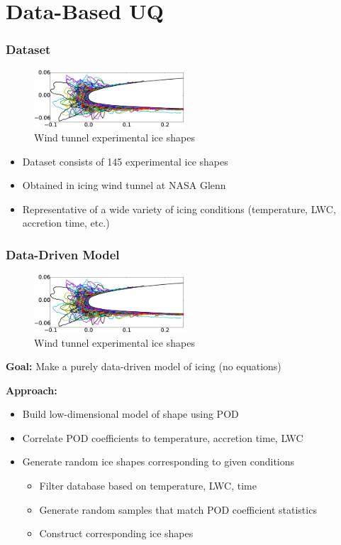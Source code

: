 \documentclass[9pt]{beamer}
\begin{document}
\section{Data-Based UQ}
\label{sec-2}
\begin{frame}
\frametitle{Dataset}
\label{sec-2-1}

\vspace*{-0.0cm}\begin{figure}
      \includegraphics[width=0.5\textwidth]{GlobalDataSet}
      \caption{Wind tunnel experimental ice shapes}
\end{figure}
\begin{itemize}
\item Dataset consists of 145 experimental ice shapes
\item Obtained in icing wind tunnel at NASA Glenn\footnotemark[1]
\item Representative of a wide variety of icing conditions (temperature,
  LWC, accretion time, etc.)
\end{itemize}
\end{frame}
\begin{frame}
\frametitle{Data-Driven Model}
\label{sec-2-2}

\vspace*{-0.0cm}\begin{figure}
      \includegraphics[width=0.5\textwidth]{GlobalDataSet}
      \caption{Wind tunnel experimental ice shapes}
\end{figure}
\textbf{Goal:} Make a purely data-driven model of icing (no equations)

\textbf{Approach:}
\begin{itemize}
\item Build low-dimensional model of shape using POD
\item Correlate POD coefficients to temperature, accretion time, LWC
\item Generate random ice shapes corresponding to given conditions
\begin{itemize}
\item Filter database based on temperature, LWC, time
\item Generate random samples that match POD coefficient statistics
\item Construct corresponding ice shapes
\end{itemize}
\end{itemize}
\end{frame}
\end{document}
